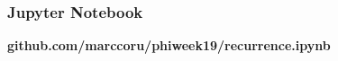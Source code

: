 \begin{frame}
	\frametitle{Jupyter Notebook}
	
	
	\Large
	\textbf{github.com/marccoru/phiweek19/recurrence.ipynb}
		
\end{frame}
%
%
%
%
%
%
%
%
%
